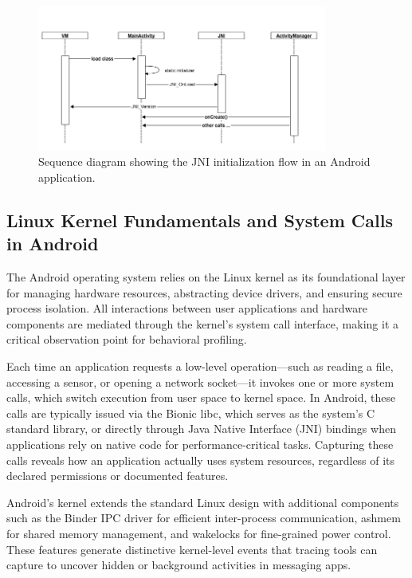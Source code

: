 \documentclass[a4paper,12pt]{report}
\begin{document}
\begin{figure}[H]
    \centering
    \includegraphics[width=0.85\textwidth]{jni_init_flow.png}
    \caption{Sequence diagram showing the JNI initialization flow in an Android application.}
    \label{fig:jni_init}
\end{figure}

\subsection{Linux Kernel Fundamentals and System Calls in Android}

The Android operating system relies on the Linux kernel as its foundational layer for managing hardware resources, abstracting device drivers, and ensuring secure process isolation. All interactions between user applications and hardware components are mediated through the kernel’s system call interface, making it a critical observation point for behavioral profiling.

Each time an application requests a low-level operation—such as reading a file, accessing a sensor, or opening a network socket—it invokes one or more system calls, which switch execution from user space to kernel space. In Android, these calls are typically issued via the Bionic libc, which serves as the system’s C standard library, or directly through Java Native Interface (JNI) bindings when applications rely on native code for performance-critical tasks. Capturing these calls reveals how an application actually uses system resources, regardless of its declared permissions or documented features.

Android’s kernel extends the standard Linux design with additional components such as the Binder IPC driver for efficient inter-process communication, ashmem for shared memory management, and wakelocks for fine-grained power control. These features generate distinctive kernel-level events that tracing tools can capture to uncover hidden or background activities in messaging apps.
\end{document}

